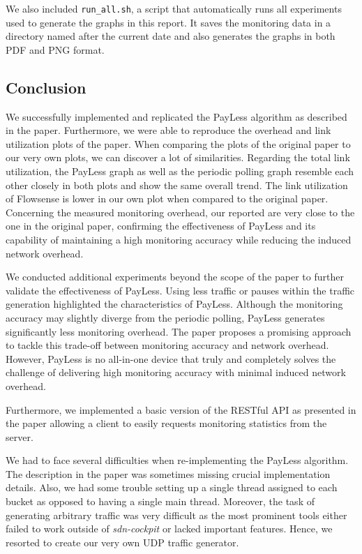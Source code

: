 \documentclass[DIV=12]{scrartcl}
\begin{document}
We also included \texttt{run\_all.sh}, a script that automatically runs all 
experiments used to generate the graphs in this report.
It saves the monitoring data in a directory named after the current date
and also generates the graphs in both PDF and PNG format.
 
\subsection{Conclusion}
We successfully implemented and replicated the PayLess algorithm as described in the paper. Furthermore, we were able to reproduce the overhead and link utilization plots of the paper. When comparing the plots of the original paper to our very own plots, we can discover a lot of similarities. Regarding the total link utilization, the PayLess graph as well as the periodic polling graph resemble each other closely in both plots and show the same overall trend. The link utilization of Flowsense is lower in our own plot when compared to the original paper. Concerning the measured monitoring overhead, our reported are very close to the one in the original paper, confirming the effectiveness of PayLess and its capability of maintaining a high monitoring accuracy while reducing the induced network overhead. 

We conducted additional experiments beyond the scope of the paper to further validate the effectiveness of PayLess. Using less traffic or pauses within the traffic generation highlighted the characteristics of PayLess. Although the monitoring accuracy may slightly diverge from the periodic polling, PayLess generates significantly less monitoring overhead. The paper proposes a promising approach to tackle this trade-off between monitoring accuracy and network overhead. However, PayLess is no all-in-one device that truly and completely solves the challenge of delivering high monitoring accuracy with minimal induced network overhead. 

Furthermore, we implemented a basic version of the RESTful API as presented in the paper allowing a client to easily requests monitoring statistics from the server.

We had to face several difficulties when re-implementing the PayLess algorithm. The description in the paper was sometimes missing crucial implementation details. Also, we had some trouble setting up a single thread assigned to each bucket as opposed to having a single main thread. Moreover, the task of generating arbitrary traffic was very difficult as the most prominent tools either failed to work outside of \textit{sdn-cockpit} or lacked important features. Hence, we resorted to create our very own UDP traffic generator.

\printbibliography
\end{document}
